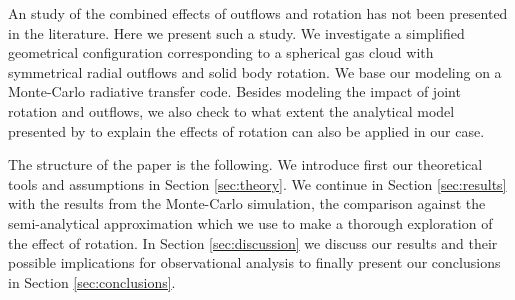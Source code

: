 \documentclass[a4paper,fleqn,usenatbib]{mnras}
\begin{document}
An study of the combined effects of outflows and rotation has not been
presented in the literature.
Here we present such a study. 
We investigate a simplified geometrical configuration corresponding to a
spherical gas cloud with symmetrical radial outflows and solid body
rotation. 
We base our modeling on a Monte-Carlo radiative transfer code.
Besides modeling the impact of joint rotation and outflows, we also
check to what extent the analytical model presented by
\cite{Garavito14} to explain the effects of rotation can also be
applied in our case.

The structure of the paper is the following.
We introduce first our theoretical tools and assumptions
in Section \ref{sec:theory}. We continue in Section  \ref{sec:results}
with the results from the Monte-Carlo simulation, the comparison
against the semi-analytical approximation which we use to make a
thorough exploration of the effect of rotation.
In Section \ref{sec:discussion} we discuss our results and their
possible implications for observational analysis to finally present
our conclusions in Section \ref{sec:conclusions}.
\end{document}
